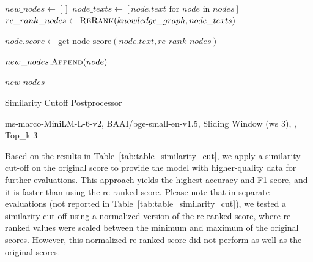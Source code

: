 \begin{algorithm}
    \begin{algorithmic}[1]
            \State $new\_nodes \gets []$
            \State $node\_texts \gets [node.text \text{ for } node \text{ in } nodes]$
            \State $re\_rank\_nodes \gets \textsc{ReRank}(knowledge\_graph, node\_texts)$

                \State $node.score \gets \text{get\_node\_score}(node.text, re\_rank\_nodes)$

                    \State $new\_nodes.\textsc{Append}(node)$
                \EndIf
            \EndFor

            \State \Return $new\_nodes$
        \EndProcedure
    \end{algorithmic}
    \caption{Similarity Cutoff Postprocessor}\label{alg:algorithm}
\end{algorithm}

\begin{table}[h!]
    \centering
    \noindent
    {\scriptsize ms-marco-MiniLM-L-6-v2, BAAI/bge-small-en-v1.5, Sliding Window (ws 3), , Top\_k 3}
    \caption{Evaluation Results for Different Similarity Cut through the Pipeline (just with the Gemma2 model)}
    \label{tab:table_similarity_cut}
\end{table}

Based on the results in Table~\ref{tab:table_similarity_cut}, we apply a similarity cut-off on the original score to provide the model with higher-quality data for further evaluations.
This approach yields the highest accuracy and F1 score, and it is faster than using the re-ranked score.
Please note that in separate evaluations (not reported in Table~\ref{tab:table_similarity_cut}), we tested a similarity cut-off using a normalized version of the re-ranked score, where re-ranked values were scaled between the minimum and maximum of the original scores.
However, this normalized re-ranked score did not perform as well as the original scores.

